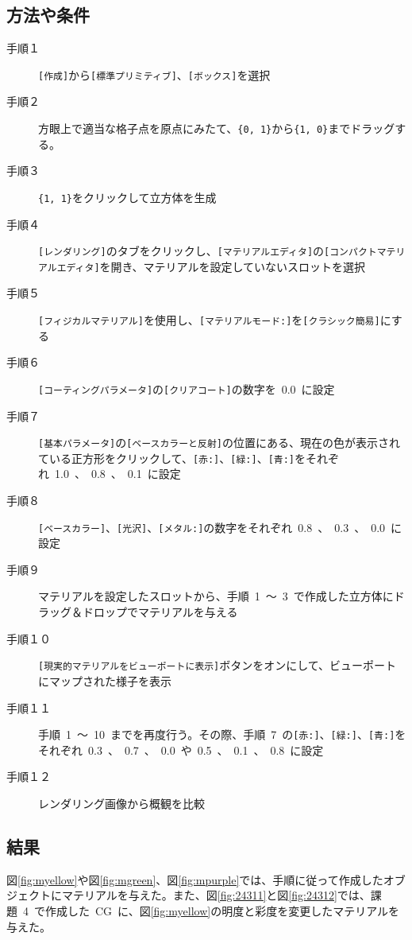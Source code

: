 \documentclass[a4j]{jarticle}
\begin{document}
\subsection{方法や条件}
%
\begin{description}
  \item[手順１] \verb|[作成]|から\verb|[標準プリミティブ]|、\verb|[ボックス]|を選択
  \item[手順２] 方眼上で適当な格子点を原点にみたて、\verb|{0, 1}|から\verb|{1, 0}|までドラッグする。
  \item[手順３] \verb|{1, 1}|をクリックして立方体を生成
  \item[手順４] \verb|[レンダリング]|のタブをクリックし、\verb|[マテリアルエディタ]|の\verb|[コンパクトマテリアルエディタ]|を開き、マテリアルを設定していないスロットを選択
  \item[手順５] \verb|[フィジカルマテリアル]|を使用し、\verb|[マテリアルモード:]|を\verb|[クラシック簡易]|にする
  \item[手順６] \verb|[コーティングパラメータ]|の\verb|[クリアコート]|の数字を\ 0.0\ に設定
  \item[手順７] \verb|[基本パラメータ]|の\verb|[ベースカラーと反射]|の位置にある、現在の色が表示されている正方形をクリックして、\verb|[赤:]|、\verb|[緑:]|、\verb|[青:]|をそれぞれ\ 1.0\ 、\ 0.8\ 、\ 0.1\ に設定
  \item[手順８] \verb|[ベースカラー]|、\verb|[光沢]|、\verb|[メタル:]|の数字をそれぞれ\ 0.8\ 、\ 0.3\ 、\ 0.0\ に設定
  \item[手順９] マテリアルを設定したスロットから、手順\ 1\ ～\ 3\ で作成した立方体にドラッグ＆ドロップでマテリアルを与える
  \item[手順１０] \verb|[現実的マテリアルをビューポートに表示]|ボタンをオンにして、ビューポートにマップされた様子を表示
  \item[手順１１] 手順\ 1\ ～\ 10\ までを再度行う。その際、手順\ 7\ の\verb|[赤:]|、\verb|[緑:]|、\verb|[青:]|をそれぞれ\ 0.3\ 、\ 0.7\ 、\ 0.0\ や\ 0.5\ 、\ 0.1\ 、\ 0.8\ に設定
  \item[手順１２] レンダリング画像から概観を比較
\end{description}

%
\newpage
\subsection{結果}
%
図\ref{fig:myellow}や図\ref{fig:mgreen}、図\ref{fig:mpurple}では、手順に従って作成したオブジェクトにマテリアルを与えた。また、図\ref{fig:24311}と図\ref{fig:24312}では、課題\ 4\ で作成した\ CG\ に、図\ref{fig:myellow}の明度と彩度を変更したマテリアルを与えた。
\end{document}
